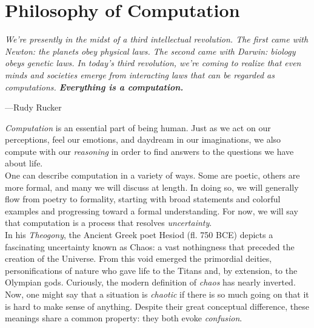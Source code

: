 \newpage


\part*{Philosophy of Computation}

\vspace{4mm}
\begin{displayquote}
	\textit{We're presently in the midst of a third intellectual revolution. The first came with Newton: the planets obey physical laws. The second came with Darwin: biology obeys genetic laws. In today’s third revolution, we're coming to realize that even minds and societies emerge from interacting laws that can be regarded as computations. \textbf{Everything is a computation.}}
	\begin{flushright}
		---Rudy Rucker
	\end{flushright}
\end{displayquote}
\vspace{4mm}

\textit{Computation} is an essential part of being human. Just as we act on our perceptions, feel our emotions, and daydream in our imaginations, we also compute with our \textit{reasoning} in order to find answers to the questions we have about life. \\

One can describe computation in a variety of ways. Some are poetic, others are more formal, and many we will discuss at length. In doing so, we will generally flow from poetry to formality, starting with broad statements and colorful examples and progressing toward a formal understanding. For now, we will say that computation is a process that resolves \textit{uncertainty}. \\

In his \textit{Theogony}, the Ancient Greek poet Hesiod (fl. 750 BCE) depicts a fascinating uncertainty known as Chaos: a vast nothingness that preceded the creation of the Universe. From this void emerged the primordial deities, personifications of nature who gave life to the Titans and, by extension, to the Olympian gods. Curiously, the modern definition of \textit{chaos} has nearly inverted. Now, one might say that a situation is \textit{chaotic} if there is so much going on that it is hard to make sense of anything. Despite their great conceptual difference, these meanings share a common property: they both evoke \textit{confusion}. \\

